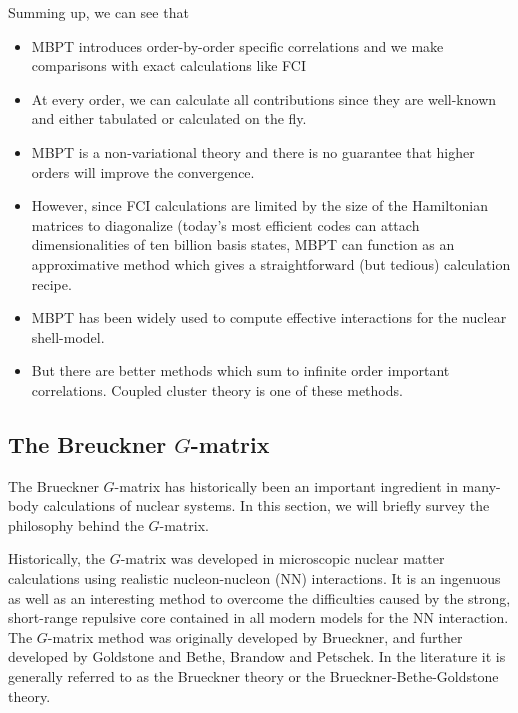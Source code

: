 Summing up, we can see that
\begin{itemize}
\item MBPT introduces order-by-order specific correlations and we make comparisons with exact calculations like FCI

\item At every order, we can calculate all contributions since they are well-known and either tabulated or calculated on the fly.

\item MBPT is a non-variational theory and there is no guarantee that higher orders will improve the convergence. 

\item However, since FCI calculations are limited by the size of the Hamiltonian matrices to diagonalize (today's most efficient codes can attach dimensionalities of ten billion basis states, MBPT can function as an approximative method which gives a straightforward (but tedious) calculation recipe. 

\item MBPT has been widely used to compute effective interactions for the nuclear shell-model.

\item But there are better methods which sum to infinite order important correlations. Coupled cluster theory is one of these methods. 
\end{itemize}




\subsection{The Breuckner $G$-matrix}

The Brueckner $G$-matrix has historically been an important ingredient
in many-body calculations of nuclear systems. In this section, we will
briefly survey the philosophy behind the $G$-matrix.

Historically, the $G$-matrix was developed in microscopic nuclear
matter calculations using realistic nucleon-nucleon (NN) interactions.
It is an ingenuous as well as an interesting method to overcome the
difficulties caused by the strong, short-range repulsive core contained
in all modern models for the NN interaction. The $G$-matrix method was
originally developed by Brueckner, and further
developed by Goldstone and Bethe, Brandow and Petschek. 
In the literature it is generally referred to as the
Brueckner theory or the Brueckner-Bethe-Goldstone theory.

